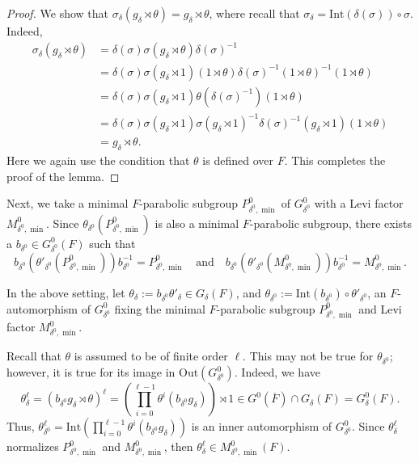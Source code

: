 \documentclass[11pt,letterpaper]{amsart}
\numberwithin{equation}{section}
\begin{document}
\begin{proof} 
We show that $\sigma_{\delta}(g_{\delta} \rtimes \theta)= g_{\delta} \rtimes \theta$, where recall that $\sigma_\delta=\textrm{Int}(\delta(\sigma)) \circ \sigma$. Indeed,
\begin{align*}
    \sigma_{\delta}(g_{\delta} \rtimes \theta)&= \delta(\sigma) \sigma(g_{\delta} \rtimes \theta) \delta(\sigma)^{-1}\\
    &= \delta(\sigma) \sigma(g_{\delta} \rtimes 1) (1 \rtimes \theta) \delta(\sigma)^{-1} (1 \rtimes \theta)^{-1} (1 \rtimes \theta)\\
    &=\delta(\sigma) \sigma(g_{\delta} \rtimes 1) \theta( \delta(\sigma)^{-1} ) (1 \rtimes \theta)\\
    &=\delta(\sigma) \sigma(g_{\delta} \rtimes 1) \sigma(g_{\delta}\rtimes 1)^{-1} \delta(\sigma)^{-1} (g_{\delta}\rtimes 1) (1 \rtimes \theta)\\
    &=g_{\delta}\rtimes \theta.
\end{align*}
Here we again use the condition that $\theta$ is defined over $F$. This completes the proof of the lemma.
\end{proof}


Next, we take a minimal $F$-parabolic subgroup $P_{\delta^0,\min}^0$ of $G_{\delta^0}^0$ with a Levi factor $M^0_{\delta^0, \min}$. Since $\theta_{\delta^0}(P_{\delta^0,\min}^0)$ is also a minimal $F$-parabolic subgroup, there exists a $b_{\delta^0} \in G_{\delta^0}^0(F)$ such that 
\[
b_{\delta^0} (\theta'_{\delta^0}(P_{\delta^0,\min}^0) )b_{\delta^0}^{-1}=P_{\delta^0,\min}^0 \quad \text{and} \quad b_{\delta^0} (\theta'_{\delta^0}(M_{\delta^0,\min}^0) )b_{\delta^0}^{-1}=M_{\delta^0,\min}^0.
\]





\begin{definition}\label{def: theta delta}
In the above setting, let $\theta_{\delta} := b_{\delta^0} \theta'_{\delta} \in G_{\delta}(F)$,  and $\theta_{\delta^0}:=\mathrm{Int}(b_{\delta^0})\circ\theta'_{\delta^0}$, an $F$-automorphism of $G^0_{\delta^0}$ fixing the minimal $F$-parabolic subgroup $P^0_{\delta^0, \min}$ and Levi factor $M^0_{\delta^0, \min}$.  
\end{definition}



Recall that $\theta$ is assumed to be of finite order $\ell$. This may not be true for $\theta_{\delta^0}$; however, it is true for its image in $\mathrm{Out}(G^0_{\delta^0}).$ Indeed, we have
\[
\theta_{\delta}^{\ell} = (b_{\delta^0}g_{\delta} \rtimes \theta)^{\ell}= \left(\prod_{i=0}^{\ell-1}\theta^i(b_{\delta^0}g_\delta) \right)\rtimes 1\in G^0(\overline{F}) \cap G_{\delta}(F) = G_{\delta}^0(F). 
\]
Thus, $\theta_{\delta^0}^\ell=\mathrm{Int}(\prod_{i=0}^{\ell-1}\theta^i(b_{\delta^0}g_\delta))$ is an inner automorphism of $G^0_{\delta^0}$. Since $\theta_{\delta}^{\ell}$ normalizes $P_{\delta^0,\min}^0$ and $M_{\delta^0,\min}^0$, then $\theta_{\delta}^{\ell} \in M^0_{\delta^0, \min}(F)$.
\end{document}
